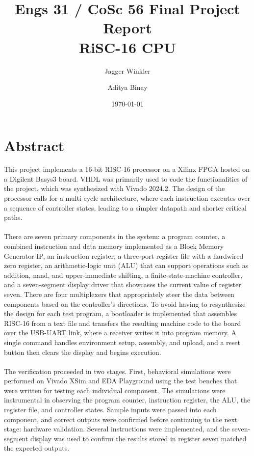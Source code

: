 \documentclass[11pt,letterpaper]{article}
\title{\vspace{-1.5em}\textbf{Engs 31 / CoSc 56 Final Project Report \\ RiSC-16 CPU}}
\author{Jagger Winkler \and Aditya Binay}
\date{\today}
\begin{document}
\maketitle
\thispagestyle{fancy}

\section*{Abstract}
This project implements a 16-bit RISC-16 processor on a Xilinx FPGA hosted on a Digilent Basys3 board. VHDL was primarily used to code the functionalities of the project, which was synthesized with Vivado 2024.2. The design of the processor calls for a multi-cycle architecture, where each instruction executes over a sequence of controller states, leading to a simpler datapath and shorter critical paths.\\
\\
There are seven primary components in the system: a program counter, a combined instruction and data memory implemented as a Block Memory Generator IP, an instruction register, a three-port register file with a hardwired zero register, an arithmetic-logic unit (ALU) that can support operations such as addition, nand, and upper-immediate shifting, a finite-state-machine controller, and a seven-segment display driver that showcases the current value of register seven. There are four multiplexers that appropriately steer the data between components based on the controller's directions. To avoid having to resynthesize the design for each test program, a bootloader is implemented that assembles RISC-16 from a text file and transfers the resulting machine code to the board over the USB-UART link, where a receiver writes it into program memory. A single command handles environment setup, assembly, and upload, and a reset button then clears the display and begins execution.\\
\\
The verification proceeded in two stages. First, behavioral simulations were performed on Vivado XSim and EDA Playground using the test benches that were written for testing each individual component. The simulations were instrumental in observing the program counter, instruction register, the ALU, the register file, and controller states. Sample inputs were passed into each component, and correct outputs were confirmed before continuing to the next stage: hardware validation. Several instructions were implemented, and the seven-segment display was used to confirm the results stored in register seven matched the expected outputs.
\end{document}
